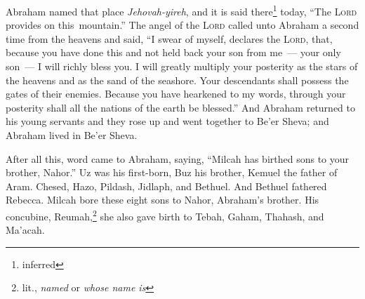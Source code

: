 \begin{inparaenum}
     Abraham named that place \textit{Jehovah-yireh}, and it is said there\footnote{inferred} today, ``The \textsc{Lord} provides on this\understood\ mountain.''%
     The angel of the \textsc{Lord} called unto Abraham a second time from the heavens%
     and said, ``I swear of myself, declares the \textsc{Lord}, that, because you have done this and not held back your son from me\understood~--- your only son~---%
     I will richly bless you. I will greatly multiply your posterity as the stars of the heavens and as the sand of the seashore. Your descendants shall possess the gates of their enemies.%
     Because you have hearkened to my words, through your posterity shall all the nations of the earth be blessed.''%
     And Abraham returned to his young servants and they rose up and went together to Be'er Sheva; and Abraham lived in Be'er Sheva.%
    
     After all this, word came to Abraham, saying, ``Milcah has birthed sons to your brother, Nahor.''%
     Uz was his first-born, Buz his brother, Kemuel the father of Aram.%
     Chesed, Hazo, Pildash, Jidlaph, and Bethuel.%
     And Bethuel fathered Rebecca. Milcah bore these eight sons to Nahor, Abraham's brother.%
     His concubine, Reumah,\footnote{lit., \textit{named} or \textit{whose name is}} she also gave birth to Tebah, Gaham, Thahash, and Ma'acah.%
\end{inparaenum}
